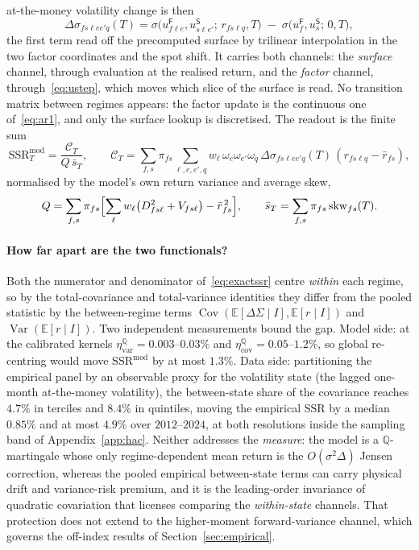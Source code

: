\documentclass[11pt]{article}
\newcommand{\E}{\mathbb{E}}
\newcommand{\Var}{\operatorname{Var}}
\newcommand{\Cov}{\operatorname{Cov}}
\newcommand{\SSR}{\mathrm{SSR}}
\newcommand{\SSRmod}{\SSR^{\mathrm{mod}}}
\providecommand{\Qmeas}{\mathbb{Q}}
\providecommand{\1}{\mathbf 1}
\begin{document}
at-the-money volatility change is then
\begin{equation}\label{eq:dsigma}
  \Delta\sigma_{f s\ell e e' q}(T)
  =\sigma\bigl(u^{\mathsf F}_{f\ell e},u^{\mathsf S}_{s\ell e'};\,r_{f s\ell q},T\bigr)
   \;-\;\sigma\bigl(u^{\mathsf F}_f,u^{\mathsf S}_s;\,0,T\bigr),
\end{equation}
the first term read off the precomputed surface by trilinear interpolation in the two factor
coordinates and the spot shift. It carries both channels: the \emph{surface} channel, through
evaluation at the realised return, and the \emph{factor} channel, through~\eqref{eq:ustep}, which
moves which slice of the surface is read. No transition matrix between regimes appears: the factor
update is the continuous one of~\eqref{eq:ar1}, and only the surface lookup is discretised. The
readout is the finite sum
\begin{equation}\label{eq:exactssr}
  \SSRmod_T=\frac{\mathcal{C}_T}{Q\,\bar s_T},\qquad
  \mathcal{C}_T=\sum_{f,s}\pi_{f s}\sum_{\ell,e,e',q}w_\ell\,\omega_e\omega_{e'}\omega_q\,
    \Delta\sigma_{f s\ell e e' q}(T)\,(r_{f s\ell q}-\bar r_{f s}),
\end{equation}
normalised by the model's own return variance and average skew,
\begin{equation}
  Q=\sum_{f,s}\pi_{f s}\Bigl[\sum_\ell w_\ell\bigl(D^2_{f s\ell}+V_{f s\ell}\bigr)-\bar r^{\,2}_{f s}\Bigr],
  \qquad
  \bar s_T=\sum_{f,s}\pi_{f s}\,\mathrm{skw}_{f s}(T).
\end{equation}

\paragraph{How far apart are the two functionals?} Both the numerator and denominator
of~\eqref{eq:exactssr} centre \emph{within} each regime, so by the total-covariance and
total-variance identities they differ from the pooled statistic by the between-regime terms
$\Cov(\E[\Delta\Sigma\mid I],\E[r\mid I])$ and $\Var(\E[r\mid I])$. Two independent measurements
bound the gap. Model side: at the calibrated kernels
$\eta^{\Qmeas}_{\mathrm{var}}=0.003$--$0.03\%$ and $\eta^{\Qmeas}_{\mathrm{cov}}=0.05$--$1.2\%$, so
global re-centring would move $\SSRmod$ by at most $1.3\%$. Data side: partitioning the empirical
panel by an observable proxy for the volatility state (the lagged one-month at-the-money
volatility), the between-state share of the covariance reaches $4.7\%$ in terciles and $8.4\%$ in
quintiles, moving the empirical $\SSR$ by a median $0.85\%$ and at most $4.9\%$ over $2012$--$2024$,
at both resolutions inside the sampling band of Appendix~\ref{app:hac}. Neither addresses the
\emph{measure}: the model is a $\Qmeas$-martingale whose only regime-dependent mean return is the
$O(\sigma^2\Delta)$ Jensen correction, whereas the pooled empirical between-state terms can carry
physical drift and variance-risk premium, and it is the leading-order invariance of quadratic
covariation that licenses comparing the \emph{within-state} channels. That protection does not
extend to the higher-moment forward-variance channel, which governs the off-index results of
Section~\ref{sec:empirical}.
\end{document}
